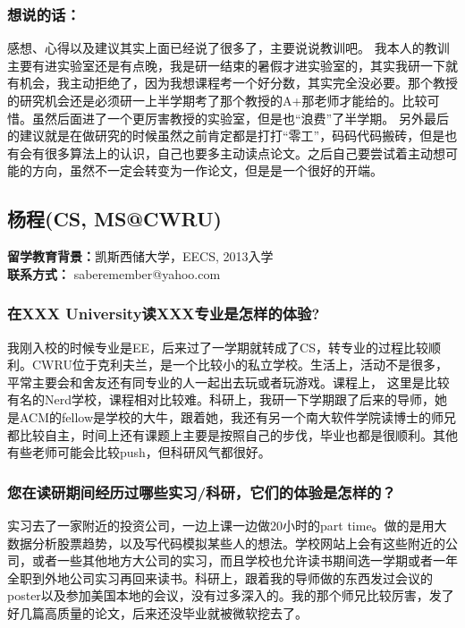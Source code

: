 \documentclass[a4paper,UTF8]{book}
\begin{document}
    \subsubsection{想说的话：}
    感想、心得以及建议其实上面已经说了很多了，主要说说教训吧。
    我本人的教训主要有进实验室还是有点晚，我是研一结束的暑假才进实验室的，其实我研一下就有机会，我主动拒绝了，因为我想课程考一个好分数，其实完全没必要。那个教授的研究机会还是必须研一上半学期考了那个教授的A+那老师才能给的。比较可惜。虽然后面进了一个更厉害教授的实验室，但是也“浪费”了半学期。
    另外最后的建议就是在做研究的时候虽然之前肯定都是打打“零工”，码码代码搬砖，但是也有会有很多算法上的认识，自己也要多主动读点论文。之后自己要尝试着主动想可能的方向，虽然不一定会转变为一作论文，但是是一个很好的开端。
     

\clearpage
\subsection{杨程(CS, MS@CWRU)}
    \textbf{留学教育背景：}凯斯西储大学，EECS, 2013入学\\
    \textbf{联系方式：} saberemember@yahoo.com

    \subsubsection*{在XXX University读XXX专业是怎样的体验?}
    我刚入校的时候专业是EE，后来过了一学期就转成了CS，转专业的过程比较顺利。CWRU位于克利夫兰，是一个比较小的私立学校。生活上，活动不是很多，平常主要会和舍友还有同专业的人一起出去玩或者玩游戏。课程上， 这里是比较有名的Nerd学校，课程相对比较难。科研上，我研一下学期跟了后来的导师，她是ACM的fellow是学校的大牛，跟着她，我还有另一个南大软件学院读博士的师兄都比较自主，时间上还有课题上主要是按照自己的步伐，毕业也都是很顺利。其他有些老师可能会比较push，但科研风气都很好。
    
    \subsubsection*{您在读研期间经历过哪些实习/科研，它们的体验是怎样的？}
    实习去了一家附近的投资公司，一边上课一边做20小时的part time。做的是用大数据分析股票趋势，以及写代码模拟某些人的想法。学校网站上会有这些附近的公司，或者一些其他地方大公司的实习，而且学校也允许读书期间选一学期或者一年全职到外地公司实习再回来读书。科研上，跟着我的导师做的东西发过会议的poster以及参加美国本地的会议，没有过多深入的。我的那个师兄比较厉害，发了好几篇高质量的论文，后来还没毕业就被微软挖去了。
    
\end{document}
